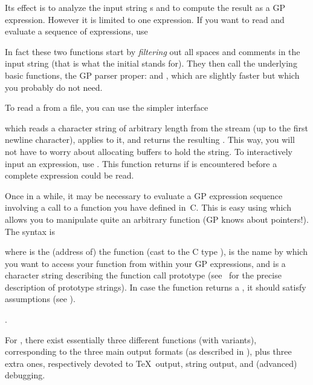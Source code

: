 
\noindent
Its effect is to analyze the input string s and to compute the result as a
GP expression.  However it is limited to one expression. If you want to read
and evaluate a sequence of expressions, use


\noindent{}
In fact these two functions start by \emph{filtering} out all spaces and
comments in the input string (that is what the initial  stands for).
They then call the underlying basic functions, the GP parser proper:
 and , which are
slightly faster but which you probably do not need.

To read a  from a file, you can use the simpler interface


which reads a character string of arbitrary length from the stream 
(up to the first newline character), applies  to it, and
returns the resulting . This way, you will not have to worry about
allocating buffers to hold the string. To interactively input an expression,
use . This function returns  if  is
encountered before a complete expression could be read.

Once in a while, it may be necessary to evaluate a GP expression sequence
involving a call to a function you have defined in~C. This is easy using
 which allows you to manipulate quite an arbitrary function (GP
knows about pointers!). The syntax is


\noindent where  is the (address of) the function (cast to the C type
),  is the name by which you want to access your
function from within your GP expressions, and  is a character
string describing the function call prototype (see~
for the precise description of prototype strings). In case the function
returns a , it should satisfy  assumptions (see
).

.

\noindent
For , there exist essentially three different functions (with
variants), corresponding to the three main  output formats (as described in
), plus three extra ones, respectively devoted to
\TeX\ output, string output, and (advanced) debugging.


